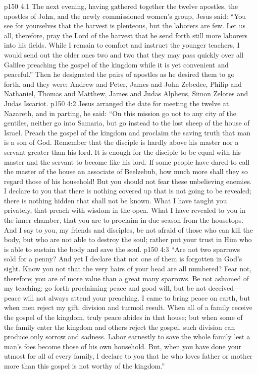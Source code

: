 \vs p150 4:1 The next evening, having gathered together the twelve apostles, the apostles of John, and the newly commissioned women’s group, Jesus said: \textcolor{ubdarkred}{“You see for yourselves that the harvest is plenteous, but the laborers are few. Let us all, therefore, pray the Lord of the harvest that he send forth still more laborers into his fields. While I remain to comfort and instruct the younger teachers, I would send out the older ones two and two that they may pass quickly over all Galilee preaching the gospel of the kingdom while it is yet convenient and peaceful.”} Then he designated the pairs of apostles as he desired them to go forth, and they were: Andrew and Peter, James and John Zebedee, Philip and Nathaniel, Thomas and Matthew, James and Judas Alpheus, Simon Zelotes and Judas Iscariot.\plusone
\vs p150 4:2 Jesus arranged the date for meeting the twelve at Nazareth, and in parting, he said: \textcolor{ubdarkred}{“On this mission go not to any city of the gentiles, neither go into Samaria, but go instead to the lost sheep of the house of Israel. Preach the gospel of the kingdom and proclaim the saving truth that man is a son of God. Remember that the disciple is hardly above his master nor a servant greater than his lord. It is enough for the disciple to be equal with his master and the servant to become like his lord. If some people have dared to call the master of the house an associate of Beelzebub, how much more shall they so regard those of his household! But you should not fear these unbelieving enemies. I declare to you that there is nothing covered up that is not going to be revealed; there is nothing hidden that shall not be known. What I have taught you privately, that preach with wisdom in the open. What I have revealed to you in the inner chamber, that you are to proclaim in due season from the housetops. And I say to you, my friends and disciples, be not afraid of those who can kill the body, but who are not able to destroy the soul; rather put your trust in Him who is able to sustain the body and save the soul.}
\vs p150 4:3 \textcolor{ubdarkred}{“Are not two sparrows sold for a penny? And yet I declare that not one of them is forgotten in God’s sight. Know you not that the very hairs of your head are all numbered? Fear not, therefore; you are of more value than a great many sparrows. Be not ashamed of my teaching; go forth proclaiming peace and good will, but be not deceived---peace will not always attend your preaching. I came to bring peace on earth, but when men reject my gift, division and turmoil result. When all of a family receive the gospel of the kingdom, truly peace abides in that house; but when some of the family enter the kingdom and others reject the gospel, such division can produce only sorrow and sadness. Labor earnestly to save the whole family lest a man’s foes become those of his own household. But, when you have done your utmost for all of every family, I declare to you that he who loves father or mother more than this gospel is not worthy of the kingdom.”}
